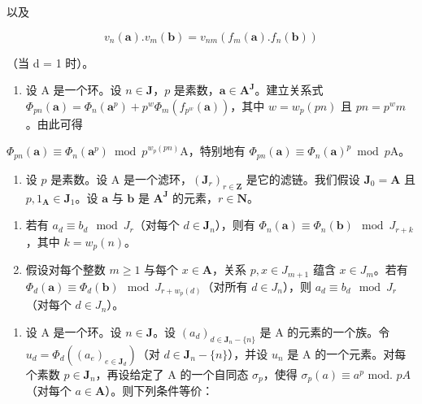 以及

\[
v _ {n} (\boldsymbol {a}). v _ {m} (\boldsymbol {b}) = v _ {n m} \left(f _ {m} (\boldsymbol {a}). f _ {n} (\boldsymbol {b})\right)
\]

（当 d = 1 时）。

\begin{enumerate}
\def\labelenumi{\arabic{enumi})}
\setcounter{enumi}{28}
\tightlist
\item
  设 A 是一个环。设 \(n \in \mathbf{J}\)，\(p\) 是素数，\(\boldsymbol{a} \in \mathbf{A}^{\mathbf{J}}\)。建立关系式 \(\Phi_{pn}(\boldsymbol{a}) = \Phi_n(\boldsymbol{a}^p) + p^w\Phi_m(f_{p^w}(\boldsymbol{a}))\)，其中 \(w = w_p(pn)\) 且 \(pn = p^w m\)。由此可得
\end{enumerate}

\(\Phi_{pn}(\boldsymbol{a}) \equiv \Phi_n(\boldsymbol{a}^p) \bmod p^{w_p(pn)}\mathrm{A}\)，特别地有 \(\Phi_{pn}(\boldsymbol{a}) \equiv \Phi_n(\boldsymbol{a})^p \bmod p\mathrm{A}\)。

\begin{enumerate}
\def\labelenumi{\arabic{enumi})}
\setcounter{enumi}{29}
\tightlist
\item
  设 \(p\) 是素数。设 A 是一个滤环，\((\mathbf{J}_r)_{r \in \mathbf{Z}}\) 是它的滤链。我们假设 \(\mathbf{J}_0 = \mathbf{A}\) 且 \(p, 1_{\mathbf{A}} \in \mathbf{J}_1\)。设 \(\boldsymbol{a}\) 与 \(\boldsymbol{b}\) 是 \(\mathbf{A}^{\mathbf{J}}\) 的元素，\(r \in \mathbf{N}\)。
\end{enumerate}

\begin{enumerate}
\def\labelenumi{\alph{enumi})}
\item
  若有 \(a_d \equiv b_d \mod J_r\)（对每个 \(d \in \mathbf{J}_n\)），则有 \(\Phi_n(\boldsymbol{a}) \equiv \Phi_n(\boldsymbol{b}) \mod J_{r+k}\)，其中 \(k = w_p(n)\)。
\item
  假设对每个整数 \(m \geqslant 1\) 与每个 \(x \in \mathbf{A}\)，关系 \(p, x \in J_{m+1}\) 蕴含 \(x \in J_m\)。若有 \(\Phi_d(\boldsymbol{a}) \equiv \Phi_d(\boldsymbol{b}) \mod J_{r+w_p(d)}\)（对所有 \(d \in J_n\)），则 \(a_d \equiv b_d \mod J_r\)（对每个 \(d \in J_n\)）。
\end{enumerate}

\begin{enumerate}
\def\labelenumi{\arabic{enumi})}
\setcounter{enumi}{30}
\tightlist
\item
  设 A 是一个环。设 \(n\in\mathbf{J}\)。设 \((a_{d})_{d\in\mathbf{J}_{n}-\{n\}}\) 是 A 的元素的一个族。令 \(u_{d}=\Phi_{d}((a_{e})_{e\in\mathbf{J}_{d}})\)（对 \(d\in\mathbf{J}_{n}-\{n\}\)），并设 \(u_{n}\) 是 A 的一个元素。对每个素数 \(p\in\mathbf{J}_{n}\)，再设给定了 A 的一个自同态 \(\sigma_{p}\)，使得 \(\sigma_{p}(a)\equiv a^{p}\text{ mod. } pA\)（对每个 \(a\in\mathbf{A}\)）。则下列条件等价：
\end{enumerate}

